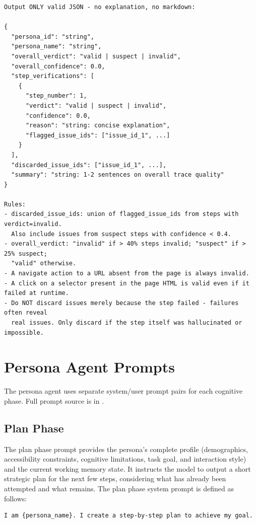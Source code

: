 \begin{itemize}
\begin{lstlisting}[caption={Supervisor Trace Verification system prompt excerpt (from \filepath{prompts/supervisor\_prompts.py}).}, label={lst:trace-verify-prompt}]
Output ONLY valid JSON - no explanation, no markdown:

{
  "persona_id": "string",
  "persona_name": "string",
  "overall_verdict": "valid | suspect | invalid",
  "overall_confidence": 0.0,
  "step_verifications": [
    {
      "step_number": 1,
      "verdict": "valid | suspect | invalid",
      "confidence": 0.0,
      "reason": "string: concise explanation",
      "flagged_issue_ids": ["issue_id_1", ...]
    }
  ],
  "discarded_issue_ids": ["issue_id_1", ...],
  "summary": "string: 1-2 sentences on overall trace quality"
}

Rules:
- discarded_issue_ids: union of flagged_issue_ids from steps with verdict=invalid.
  Also include issues from suspect steps with confidence < 0.4.
- overall_verdict: "invalid" if > 40% steps invalid; "suspect" if > 25% suspect;
  "valid" otherwise.
- A navigate action to a URL absent from the page is always invalid.
- A click on a selector present in the page HTML is valid even if it failed at runtime.
- Do NOT discard issues merely because the step failed - failures often reveal
  real issues. Only discard if the step itself was hallucinated or impossible.
\end{lstlisting}


\section{Persona Agent Prompts}
\label{app:persona-prompts}

The persona agent uses separate system/user prompt pairs for each cognitive phase. Full prompt source is in .

\subsection{Plan Phase}

The plan phase prompt provides the persona's complete profile (demographics, accessibility constraints, cognitive limitations, task goal, and interaction style) and the current working memory state. It instructs the model to output a short strategic plan for the next few steps, considering what has already been attempted and what remains. The plan phase system prompt is defined as follows:

\begin{lstlisting}[caption={Persona Agent Plan Phase system prompt excerpt (from \filepath{prompts/persona\_prompts.py}).}, label={lst:persona-plan-prompt}]
I am {persona_name}. I create a step-by-step plan to achieve my goal.


\end{lstlisting}
\end{itemize}
